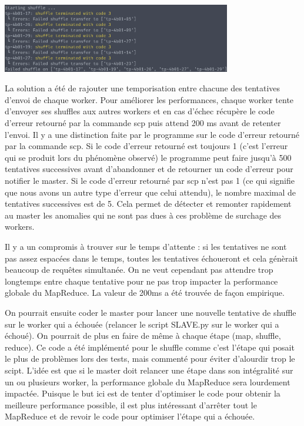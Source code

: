 \documentclass[11pt,a4paper]{article}
\begin{document}
\includegraphics[width=10cm]{screenshot_shuffle7.png}

La solution a été de rajouter une temporisation entre chacune des tentatives d'envoi de chaque worker. Pour améliorer les performances, chaque worker tente d'envoyer ses shuffles aux autres workers et en cas d'échec récupère le code d'erreur retourné par la commande scp puis attend 200 ms avant de retenter l'envoi. Il y a une distinction faite par le programme sur le code d'erreur retourné par la commande scp. Si le code d'erreur retourné est toujours 1 (c'est l'erreur qui se produit lors du phénomène observé) le programme peut faire jusqu'à 500 tentatives successives avant d'abandonner et de retourner un code d'erreur pour notifier le master. Si le code d'erreur retourné par scp n'est pas 1 (ce qui signifie que nous avons un autre type d'erreur que celui attendu), le nombre maximal de tentatives successives est de 5. Cela permet de détecter et remonter rapidement au master les anomalies qui ne sont pas dues à ces problème de surchage des workers.

Il y a un compromis à trouver sur le temps d'attente : si les tentatives ne sont pas assez espacées dans le temps, toutes les tentatives échoueront et cela génèrait beaucoup de requêtes simultanée. On ne veut cependant pas attendre trop longtemps entre chaque tentative pour ne pas trop impacter la performance globale du MapReduce. La valeur de 200ms a été trouvée de façon empirique.

On pourrait ensuite coder le master pour lancer une nouvelle tentative de shuffle sur le worker qui a échouée (relancer le script SLAVE.py sur le worker qui a échoué). On pourrait de plus en faire de même à chaque étape (map, shuffle, reduce). Ce code a été implémenté pour le shuffle comme c'est l'étape qui posait le plus de problèmes lors des tests, mais commenté pour éviter d'alourdir trop le scipt. L'idée est que si le master doit relancer une étape dans son intégralité sur un ou plusieurs worker, la performance globale du MapReduce sera lourdement impactée. Puisque le but ici est de tenter d'optimiser le code pour obtenir la meilleure performance possible, il est plus intéressant d'arrêter tout le MapReduce et de revoir le code pour optimiser l'étape qui a échouée.
\end{document}
